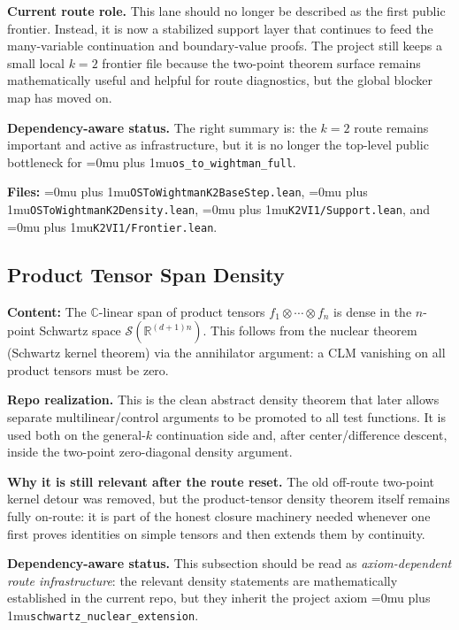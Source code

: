 \documentclass[11pt,a4paper]{article}
\newcommand{\Schwartz}{\mathscr{S}}
\newcommand{\leanname}[1]{\begingroup\Urlmuskip=0mu plus 1mu\relax\nolinkurl{#1}\endgroup}
\begin{document}
\medskip\noindent
\textbf{Current route role.}
This lane should no longer be described as the first public frontier. Instead,
it is now a stabilized support layer that continues to feed the many-variable
continuation and boundary-value proofs. The project still keeps a small local
$k=2$ frontier file because the two-point theorem surface remains mathematically
useful and helpful for route diagnostics, but the global blocker map has moved on.

\medskip\noindent
\textbf{Dependency-aware status.}
The right summary is: the $k=2$ route remains important and active as
infrastructure, but it is no longer the top-level public bottleneck for
\leanname{os\_to\_wightman\_full}.

\textbf{Files:} \leanname{OSToWightmanK2BaseStep.lean},
\leanname{OSToWightmanK2Density.lean},
\leanname{K2VI1/Support.lean}, and \leanname{K2VI1/Frontier.lean}.

\subsection{Product Tensor Span Density}

\textbf{Content:} The $\mathbb{C}$-linear span of product tensors
$f_1 \otimes \cdots \otimes f_n$ is dense in the $n$-point Schwartz
space $\Schwartz(\mathbb{R}^{(d+1)n})$. This follows from the nuclear
theorem (Schwartz kernel theorem) via the annihilator argument:
a CLM vanishing on all product tensors must be zero.

\medskip\noindent
\textbf{Repo realization.}
This is the clean abstract density theorem that later allows separate
multilinear/control arguments to be promoted to all test functions. It is used
both on the general-$k$ continuation side and, after center/difference descent,
inside the two-point zero-diagonal density argument.

\medskip\noindent
\textbf{Why it is still relevant after the route reset.}
The old off-route two-point kernel detour was removed, but the product-tensor
density theorem itself remains fully on-route: it is part of the honest closure
machinery needed whenever one first proves identities on simple tensors and then
extends them by continuity.

\medskip\noindent
\textbf{Dependency-aware status.}
This subsection should be read as \emph{axiom-dependent route infrastructure}:
the relevant density statements are mathematically established in the current
repo, but they inherit the project axiom
\leanname{schwartz\_nuclear\_extension}.
\end{document}
